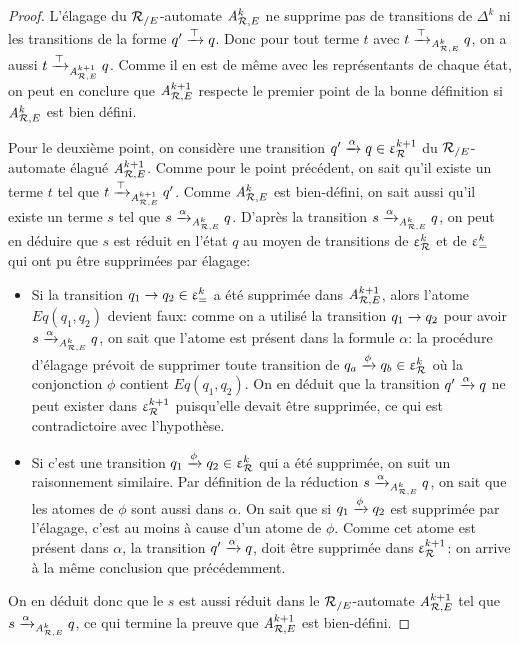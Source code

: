 \begin{proof}
L'élagage du ${\mathcal R_{/E}}$-automate ${\mathit A}_{\mathcal R,E}^k$ ne supprime pas de transitions de $\Delta^k$
ni les transitions de la forme $q'\xrightarrow{\top} q$. Donc pour tout terme $t$ avec
$t \xrightarrow{\top}_{{\mathit A}_{\mathcal R,E}^k} q$, on a aussi $t \xrightarrow{\top}_{{\mathit A}_{\mathcal R,E}^{k+1}} q$. Comme il en est de même
avec les représentants de chaque état, on peut en conclure que ${\mathit A}_{\mathcal R,E}^{k+1}$ respecte le premier
point de la bonne définition si ${\mathit A}_{\mathcal R,E}^k$ est bien défini.

Pour le deuxième point, on considère une transition $q' \xrightarrow{\alpha} q \in \upvarepsilon_{\mathcal R}^{k+1}$ du ${\mathcal R_{/E}}$-automate
élagué ${\mathit A}_{\mathcal R,E}^{k+1}$.
Comme pour le point précédent, on sait qu'il existe un terme $t$ tel que $t \xrightarrow{\top}_{{\mathit A}_{\mathcal R,E}^{k+1}} q'$. 
Comme ${\mathit A}_{\mathcal R,E}^{k}$ est bien-défini, on sait aussi qu'il existe un terme $s$ tel que $s \xrightarrow{\alpha}_{{\mathit A}_{\mathcal R,E}^k} q$.
D'après la transition $s \xrightarrow{\alpha}_{{\mathit A}_{\mathcal R,E}^k} q$, on peut en déduire que $s$ est réduit en l'état $q$
au moyen de transitions de $\upvarepsilon_{\mathcal R}^k$ et de $\upvarepsilon_{=}^k$ qui ont pu être supprimées par élagage:
\begin{itemize}
\item 
  Si la transition $q_1 \rightarrow q_2 \in \upvarepsilon_{=}^k$ a été supprimée dans ${\mathit A}_{\mathcal R,E}^{k+1}$, alors l'atome $Eq(q_1,q_2)$
devient faux: comme on a utilisé la transition $q_1 \rightarrow q_2$ pour avoir $s \xrightarrow{\alpha}_{{\mathit A}_{\mathcal R,E}^k} q$,
on sait que l'atome est présent dans la formule $\alpha$: la procédure d'élagage prévoit de supprimer 
toute transition de $q_a \xrightarrow{\phi} q_b \in \upvarepsilon_{\mathcal R}^k$ où la conjonction $\phi$ contient  $Eq(q_1,q_2)$.
On en déduit que la transition $q' \xrightarrow{\alpha} q$ ne peut exister dans $\upvarepsilon_{\mathcal R}^{k+1}$ puisqu'elle devait être supprimée,
ce qui est contradictoire avec l'hypothèse.
\item 
  Si c'est une transition $q_1 \xrightarrow{\phi} q_2 \in \upvarepsilon_{\mathcal R}^k$ qui a été supprimée, on suit un raisonnement similaire.
  Par définition de la réduction $s \xrightarrow{\alpha}_{{\mathit A}_{\mathcal R,E}^k} q$, on sait que les atomes de $\phi$ sont aussi
  dans $\alpha$.  On sait que si $q_1 \xrightarrow{\phi} q_2$ est supprimée par l'élagage, c'est au moins à cause d'un atome
  de $\phi$. Comme cet atome est présent dans $\alpha$, la transition $q' \xrightarrow{\alpha} q$, doit être supprimée dans 
  $\upvarepsilon_{\mathcal R}^{k+1}$: on arrive à la même conclusion que précédemment.
\end{itemize}
On en déduit donc que le $s$ est aussi réduit dans le ${\mathcal R_{/E}}$-automate ${\mathit A}_{\mathcal R,E}^{k+1}$ tel que $s \xrightarrow{\alpha}_{{\mathit A}_{\mathcal R,E}^k} q$,
ce qui termine la preuve que ${\mathit A}_{\mathcal R,E}^{k+1}$ est bien-défini.
\end{proof}

